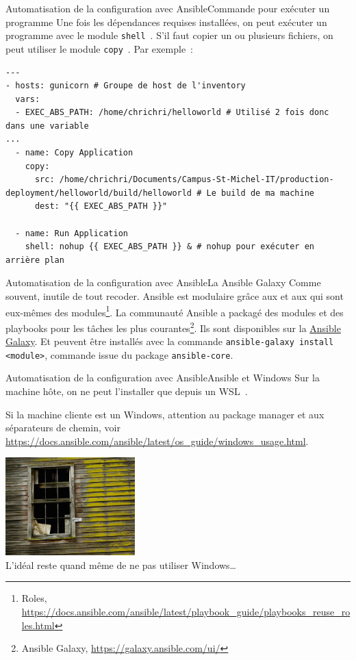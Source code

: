 \documentclass{beamer}
\begin{document}
    \begin{frame}[fragile]{Automatisation de la configuration avec Ansible}{Commande pour exécuter un programme}
        Une fois les dépendances requises installées, on peut exécuter un programme avec le module \lstinline{shell}~.
        \bigbreak
        S’il faut copier un ou plusieurs fichiers, on peut utiliser le module \lstinline{copy}~.
        \bigbreak
        Par exemple~:
        \begin{lstlisting}
---
- hosts: gunicorn # Groupe de host de l'inventory
  vars:
  - EXEC_ABS_PATH: /home/chrichri/helloworld # Utilisé 2 fois donc dans une variable
...
  - name: Copy Application
    copy:
      src: /home/chrichri/Documents/Campus-St-Michel-IT/production-deployment/helloworld/build/helloworld # Le build de ma machine
      dest: "{{ EXEC_ABS_PATH }}"

  - name: Run Application
    shell: nohup {{ EXEC_ABS_PATH }} & # nohup pour exécuter en arrière plan
        \end{lstlisting}
    \end{frame}

    \begin{frame}{Automatisation de la configuration avec Ansible}{La Ansible Galaxy}
        Comme souvent, inutile de tout recoder.
        Ansible est modulaire grâce aux  et aux  qui sont eux-mêmes des modules\footnote{Roles, \url{https://docs.ansible.com/ansible/latest/playbook_guide/playbooks_reuse_roles.html}}.
        \bigbreak
        La communauté Ansible a packagé des modules et des playbooks pour les tâches les plus courantes\footnote{Ansible Galaxy, \url{https://galaxy.ansible.com/ui/}}.
        Ils sont disponibles sur la \href{https://galaxy.ansible.com/}{Ansible Galaxy}.
        Et peuvent être installés avec la commande \lstinline{ansible-galaxy install <module>}, commande issue du package \lstinline{ansible-core}.
    \end{frame}

    \begin{frame}{Automatisation de la configuration avec Ansible}{Ansible et Windows}
        Sur la machine hôte, on ne peut l'installer que depuis un WSL~.
        \begin{dangercolorbox}
            Si la machine cliente est un Windows, attention au package manager et aux séparateurs de chemin, voir \url{https://docs.ansible.com/ansible/latest/os_guide/windows_usage.html}.
        \end{dangercolorbox}
        \bigbreak
        \centering
        \includegraphics[width=5cm]{image/broken-windows} \\ L'idéal reste quand même de ne pas utiliser Windows\ldots \\
    \end{frame}
\end{document}
